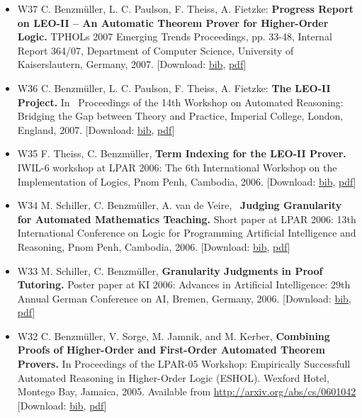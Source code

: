 \documentclass{article}
\newcommand{\tmstrong}[1]{\textbf{#1}}
\newcommand{\tmtextbf}[1]{{\bfseries{#1}}}
\newenvironment{itemizedot}{\begin{itemize} \renewcommand{\labelitemi}{$\bullet$}\renewcommand{\labelitemii}{$\bullet$}\renewcommand{\labelitemiii}{$\bullet$}\renewcommand{\labelitemiv}{$\bullet$}}{\end{itemize}}
\begin{document}
\begin{itemizedot}
  \item [W37] {\small C. Benzm\"uller, L. C. Paulson, F. Theiss, A. Fietzke:
  {\tmstrong{Progress Report on LEO-II -- An Automatic Theorem Prover for
  Higher-Order Logic.}} TPHOLs 2007 Emerging Trends Proceedings, pp. 33-48,
  Internal Report 364/07, Department of Computer Science,} University of
  Kaiserslautern, Germany, 2007. {\color{grey} [Download: {\small
  \href{../papers/W37.bib}{bib}, \href{../papers/W37.pdf}{pdf}}]}
  
  \item [W36] {\small C. Benzm\"uller, L. C. Paulson, F. Theiss, A. Fietzke:
  \tmtextbf{The LEO-II Project.}} {\small In \ Proceedings of the 14th
  Workshop on Automated Reasoning: Bridging the Gap between Theory and
  Practice, Imperial College, London, England, 2007.} {\color{grey} [Download:
  {\small \href{../papers/W36.bib}{bib}, \href{../papers/W36.pdf}{pdf}}]}
  
  \item [W35] F. Theiss, C. Benzm\"uller, \tmtextbf{Term Indexing for the
  LEO-II Prover. }IWIL-6 workshop at LPAR 2006: The 6th International Workshop
  on the Implementation of Logics, Pnom Penh, Cambodia, 2006. {\color{grey}
  [Download: {\small \href{../papers/W35.bib}{bib}}, {\small
  \href{../papers/W35.pdf}{pdf}}]}
  
  \item [W34] M. Schiller, C. Benzm\"uller, A. van de Veire, \
  \tmtextbf{Judging Granularity for Automated Mathematics Teaching.} Short
  paper at LPAR 2006: 13th International Conference on Logic for Programming
  Artificial Intelligence and Reasoning, Pnom Penh, Cambodia, 2006.
  {\color{grey} [Download: {\small \href{../papers/W34.bib}{bib}}, {\small
  \href{../papers/W34.pdf}{pdf}}]}
  
  \item [W33] M. Schiller, C. Benzm\"uller, \tmtextbf{Granularity Judgments in
  Proof Tutoring.} Poster paper at KI 2006: Advances in Artificial
  Intelligence: 29th Annual German Conference on AI, Bremen, Germany, 2006.
  {\color{grey} [Download: {\small \href{../papers/W33.bib}{bib}}, {\small
  \href{../papers/W33.pdf}{pdf}}]}
  
  \item [W32] C. Benzm\"uller, V. Sorge, M. Jamnik, and M. Kerber,
  \tmtextbf{Combining Proofs of Higher-Order and First-Order Automated Theorem
  Provers.} In Proceedings of the LPAR-05 Workshop: Empirically Successfull
  Automated Reasoning in Higher-Order Logic (ESHOL). Wexford Hotel, Montego
  Bay, Jamaica, 2005. Available from
  \href{http://arxiv.org/abs/cs/0601042}{http://arxiv.org/abs/cs/0601042}
  {\color{grey} [Download: {\small \href{../papers/W32.bib}{bib},
  \href{../papers/W32.pdf}{pdf}}]}
  

\end{itemizedot}
\end{document}
